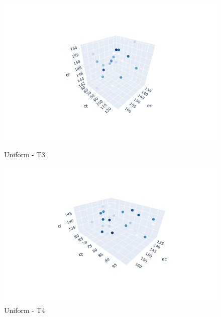 \documentclass{hust}
\begin{document}
\begin{itemize}
	\begin{figure}[H]
		\begin{minipage}{0.5\textwidth}
			\centering
			\includegraphics[width=1.2\linewidth]{images/uu-dem3.png}
			\caption{Uniform - T3}\label{fig:nsga-ii-uu-dem3}
		\end{minipage}\hfill
		\begin{minipage}{0.5\textwidth}
			\centering
			\includegraphics[width=1.2\linewidth]{images/uu-dem4.png}
			\caption{Uniform - T4}\label{fig:nsga-ii-uu-dem4}
		\end{minipage}
	\end{figure}
	

\end{itemize}
\end{document}
